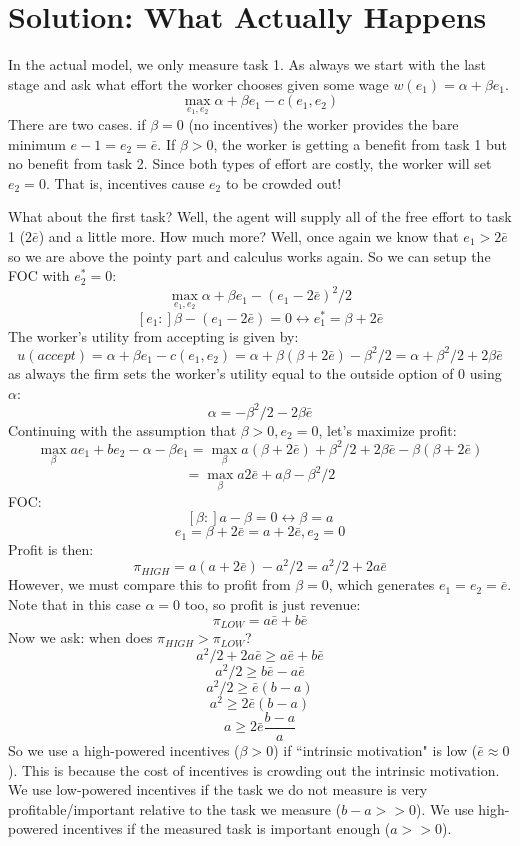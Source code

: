 \documentclass{article}
\begin{document}
\section{Solution: What Actually Happens}

In the actual model, we only measure task 1. As always we start with the last stage and ask what effort the worker chooses given some wage $w(e_1)=\alpha + \beta e_1$.
\[\max_{e_1, e_2} \alpha + \beta e_1 - c(e_1, e_2)\]
There are two cases. if $\beta=0$ (no incentives) the worker provides the bare minimum $e-1=e_2=\bar e$. If $\beta>0$, the worker is getting a benefit from task 1 but no benefit from task 2. Since both types of effort are costly, the worker will set $e_2=0$. That is, incentives cause $e_2$ to be crowded out!

What about the first task? Well, the agent will supply all of the free effort to task 1 ($2\bar e$) and a little more. How much more? Well, once again we know that $e_1>2\bar e$ so we are above the pointy part and calculus works again. So we can setup the FOC with $e_2^*=0$:
\[\max_{e_1, e_2} \alpha + \beta e_1 - (e_1-2\bar e)^2/2\]
\[[e_1:] \beta -(e_1-2\bar e) =0 \leftrightarrow e_1^* = \beta + 2\bar e\]
The worker's utility from accepting is given by:
\[u(accept)=\alpha +\beta e_1-c(e_1, e_2)=\alpha +\beta(\beta + 2\bar e) -\beta^2/2= \alpha +\beta^2/2+2\beta \bar e\]
as always the firm sets the worker's utility equal to the outside option of 0 using $\alpha$:
\[\alpha = -\beta^2/2-2\beta \bar e\]
Continuing with the assumption that $\beta>0, e_2=0$, let's maximize profit:
\[\max_\beta ae_1 + be_2 - \alpha - \beta e_1 = \max_\beta a(\beta + 2\bar e) +\beta^2/2+2\beta \bar e-\beta (\beta + 2\bar e)\]
\[=\max_\beta a2\bar e+a \beta -\beta^2/2\]
FOC:
\[[\beta:] a-\beta =0 \leftrightarrow \beta = a \]
\[e_1 = \beta + 2\bar e =a+ 2\bar e, e_2=0\]
Profit is then:
\[\pi_{HIGH}=a(a+ 2\bar e)- a^2/2=a^2/2+ 2a\bar e\]
However, we must compare this to profit from $\beta=0$, which generates $e_1=e_2=\bar e$. Note that in this case $\alpha =0$ too, so profit is just revenue:
\[\pi_{LOW} = a \bar e + b \bar e\]
Now we ask: when does $\pi_{HIGH}>\pi_{LOW}$?
\[a^2/2+ 2a\bar e \geq a \bar e + b \bar e\]
\[a^2/2 \geq b \bar e- a \bar e\]
\[a^2/2 \geq \bar e( b - a )\]
\[a^2 \geq 2\bar e( b - a )\]
\[a \geq 2\bar e\frac{ b - a }{a}\]
So we use a high-powered incentives ($\beta>0$) if ``intrinsic motivation" is low ($\bar e\approx 0$). This is because the cost of incentives is crowding out the intrinsic motivation. We use low-powered incentives if the task we do not measure is very profitable/important relative to the task we measure ($b-a>>0$). We use high-powered incentives if the measured task is important enough ($a>>0$).
\end{document}
